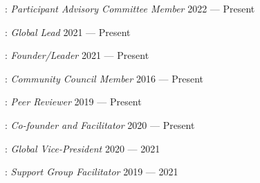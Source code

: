 : \textit{Participant Advisory Committee Member}
\hfill 2022 --- Present

: \textit{Global Lead}
\hfill 2021 --- Present

: \textit{Founder/Leader} \hfill 2021 --- Present

:
\textit{Community Council Member} \hfill 2016 --- Present

: \textit{Peer
	Reviewer} \hfill 2019 --- Present

: \textit{Co-founder and Facilitator}
\hfill 2020 --- Present

: \textit{Global Vice-President}
\hfill 2020 --- 2021

: \textit{Support Group Facilitator}
\hfill 2019 --- 2021

